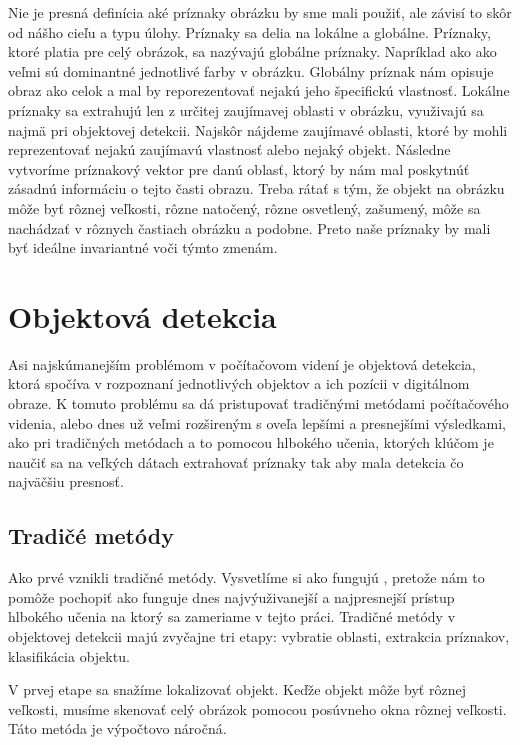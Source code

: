 Nie je presná definícia aké príznaky obrázku by sme mali použiť, ale závisí to skôr od nášho cieľu a typu úlohy. Príznaky sa delia na lokálne a globálne. Príznaky, ktoré platia pre celý obrázok, sa nazývajú globálne príznaky. Napríklad ako ako veľmi sú dominantné jednotlivé farby v obrázku. Globálny príznak nám opisuje obraz ako celok a mal by reporezentovať nejakú jeho špecifickú vlastnosť. Lokálne príznaky sa extrahujú len z určitej zaujímavej oblasti v obrázku, využivajú sa najmä pri objektovej detekcii. Najskôr nájdeme zaujímavé oblasti, ktoré by mohli reprezentovať nejakú zaujímavú vlastnosť alebo nejaký objekt. Následne vytvoríme príznakový vektor pre danú oblasť, ktorý by nám mal poskytnúť zásadnú informáciu o tejto časti obrazu. Treba rátať s tým, že objekt na obrázku môže byť rôznej veľkosti, rôzne natočený, rôzne osvetlený, zašumený, môže sa nachádzať v rôznych častiach obrázku a podobne. Preto naše príznaky by mali byť ideálne invariantné voči týmto zmenám.

\section{Objektová detekcia}

\hspace{\parindent}Asi najskúmanejším problémom v počítačovom videní je objektová detekcia, ktorá spočíva v rozpoznaní jednotlivých objektov a ich pozícii v digitálnom obraze. K tomuto problému sa dá pristupovať tradičnými metódami počítačového videnia, alebo dnes už veľmi rozšireným s oveľa lepšími a presnejšími výsledkami, ako pri tradičných metódach a to pomocou hlbokého učenia, ktorých klúčom je naučiť sa na veľkých dátach extrahovať príznaky tak aby mala detekcia čo najväčšiu presnosť.

\subsection{Tradičé metódy}
\hspace{\parindent}Ako prvé vznikli tradičné metódy. Vysvetlíme si ako fungujú , pretože nám to pomôže pochopiť ako funguje dnes najvýuživanejší a najpresnejší prístup hlbokého učenia na ktorý sa zameriame v tejto práci. Tradičné metódy v objektovej detekcii majú zvyčajne tri etapy: vybratie oblasti, extrakcia príznakov, klasifikácia objektu. 

V prvej etape sa snažíme lokalizovať objekt. Keďže objekt môže byť rôznej veľkosti, musíme skenovať celý obrázok pomocou posúvneho okna rôznej veľkosti. Táto metóda je výpočtovo náročná. 


